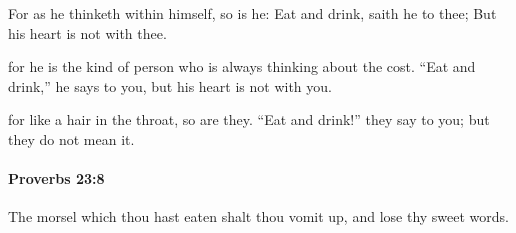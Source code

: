 			\begin{versebox}
					\item[BHS] 
					\item[ASV] For as he thinketh within himself, so is he: Eat and drink, saith he to thee; But his heart is not with thee.
					\item[NIV] for he is the kind of person who is always thinking about the cost. “Eat and drink,” he says to you, but his heart is not with you.
					\item[NRSV] for like a hair in the throat, so are they. “Eat and drink!” they say to you; but they do not mean it.
			\end{versebox}

		\paragraph{Proverbs 23:8} %
			\label{PROVERBS-23-8}

			The morsel which thou hast eaten shalt thou vomit up, and lose thy sweet words.

